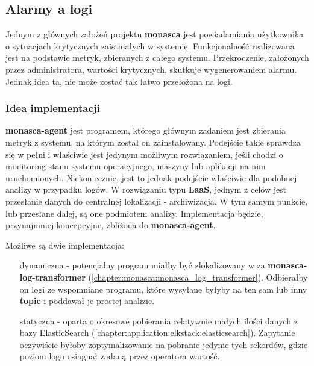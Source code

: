 \subsection{Alarmy a logi}
\label{chapter:application:plans:alarm_on_logs}

Jednym z głównych założeń projektu \textbf{monasca} jest powiadamiania użytkownika o 
sytuacjach krytycznych zaistniałych w systemie. Funkcjonalność realizowana jest na podstawie
metryk, zbieranych z całego systemu. Przekroczenie, założonych przez administratora, wartości
krytycznych, skutkuje wygenerowaniem alarmu. Jednak idea ta, nie może zostać
tak łatwo przełożona na logi. 

    \subsubsection{Idea implementacji}
    \textbf{monasca-agent} jest programem, którego głównym zadaniem jest zbierania metryk z systemu, na którym
    został on zainstalowany. Podejście takie sprawdza się w pełni i właściwie jest jedynym możliwym rozwiązaniem,
    jeśli chodzi o monitoring stanu systemu operacyjnego, maszyny lub aplikacji na nim uruchomionych. Niekoniecznie,
    jest to jednak podejście właściwie dla podobnej analizy w przypadku logów. W rozwiązaniu typu \textbf{LaaS}, 
    jednym z celów jest przesłanie danych do centralnej lokalizacji - archiwizacja. W tym samym punkcie, lub
    przesłane dalej, są one podmiotem analizy. Implementacja będzie, przynajmniej koncepcyjne, zbliżona do \textbf{monasca-agent}.
    
    Możliwe są dwie implementacja:
    \begin{itemize}
        \item[dynamiczna] - potencjalny program miałby być zlokalizowany w za \textbf{monasca-log-transformer} (\ref{chapter:monasca:monasca_log_transformer}).
        Odbierałby on logi ze wspomniane programu, które wysyłane byłyby na ten sam lub inny \textbf{topic} i poddawał je prostej analizie. 
        \item[statyczna] - oparta o okresowe pobierania relatywnie małych ilości danych z bazy ElasticSearch (\ref{chapter:application:elkstack:elasticsearch}). 
        Zapytanie oczywiście byłoby zoptymalizowanie na pobranie jedynie tych rekordów, gdzie poziom logu osiągnął zadaną przez operatora wartość.
    \end{itemize}
    
